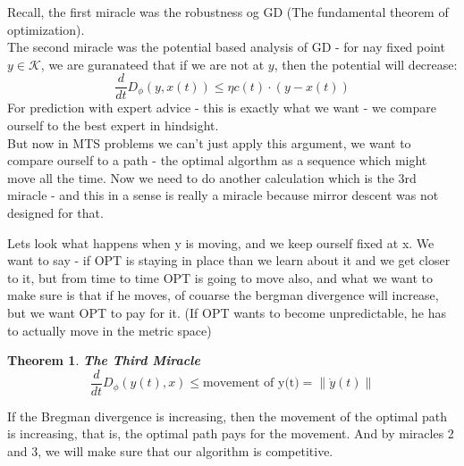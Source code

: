 \documentclass[11pt]{book} %
\newtheorem{theorem}{Theorem}[section]
\begin{document}
Recall, the first miracle was the robustness og GD (The fundamental theorem of optimization). \\
The second miracle was the potential based analysis of GD - for nay fixed point $y \in \mathcal{K}$,
we are guranateed that if we are not at $y$, then the potential will decrease: 
\[ 
    \frac{d}{dt} D_{\phi}(y, x(t)) \leq \eta c(t) \cdot (y - x(t))
\]
For prediction with expert advice - this is exactly what we want - we compare ourself to the best expert in hindsight. \\
But now in MTS problems we can't just apply this argument, we want to compare ourself to a path - the optimal algorthm as a 
sequence which might move all the time. 
Now we need to do another calculation which is the 3rd miracle - and this in a sense is really a miracle 
because mirror descent was not designed for that.

\bigbreak

Lets look what happens when y is moving, and we keep ourself fixed at x.
We want to say - if OPT is staying in place than we learn about it and we get closer to it,
but from time to time OPT is going to move also, and what we want to make sure is that if he moves, 
of couarse the bergman divergence will increase, but we want OPT to pay for it. 
(If OPT wants to become unpredictable, he has to actually move in the metric space)

\begin{boxA}
    \begin{theorem}{\textbf{The Third Miracle}} \\

        \begin{equation*}
            \frac{d}{dt} D_{\phi}(y(t), x) \leq \text{movement of y(t)} =  \| \dot{y}(t) \|
        \end{equation*}

    \end{theorem}
\end{boxA}

If the Bregman divergence is increasing, then the movement of the optimal path is increasing, 
that is, the optimal path pays for the movement. And by miracles 2 and 3,
 we will make sure that our algorithm is competitive.


\end{document}
